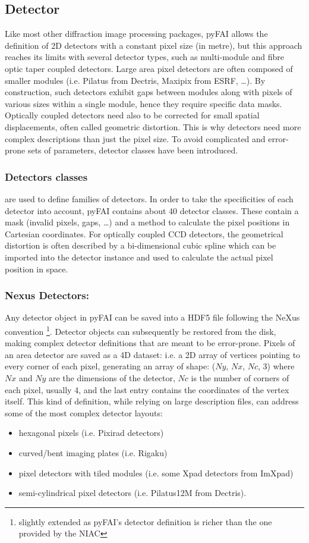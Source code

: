 \documentclass{iucr}
\begin{document}
\subsection{Detector}
Like most other diffraction image processing packages, pyFAI allows the definition of
2D detectors with a constant pixel size (in metre), but this approach reaches
its limits with several detector types, such as multi-module and fibre optic
taper coupled detectors.
Large area pixel detectors are often composed of smaller modules (i.e. Pilatus
from Dectris, Maxipix from ESRF,
\ldots).
By construction, such detectors exhibit gaps between modules along with
pixels of various sizes within a single module, hence they require specific
data masks.
Optically coupled detectors need also to be corrected
for small spatial displacements, often called geometric distortion.
This is why detectors need more complex descriptions than just the pixel size.
To avoid complicated and error-prone sets of parameters, detector classes have
been introduced.

\subsubsection{Detectors classes} are used to define families of detectors.
In order to take the specificities of each detector into account, pyFAI
contains about 40 detector classes. These contain a mask
(invalid pixels, gaps, \ldots) and a method to calculate the pixel positions in Cartesian
coordinates.
For optically coupled CCD detectors, the geometrical distortion is often
described by a bi-dimensional cubic spline which can be imported into
the detector instance and used to calculate the actual pixel position in space.

\subsubsection{Nexus Detectors:}
Any detector object in pyFAI can be saved into a HDF5 file following the NeXus
convention \cite{nexus}\footnote{slightly extended as pyFAI's detector
definition is richer than the one provided by the NIAC}.
Detector objects can subsequently be restored from the disk, making
complex detector definitions that are meant to be error-prone.
Pixels of an area detector are saved as a 4D dataset: i.e. a 2D
array of vertices pointing to every corner of each pixel, generating
an array of shape: ($Ny$, $Nx$, $Nc$, 3) where $Nx$ and $Ny$ are the dimensions of the
detector, $Nc$ is the number of corners of each pixel, usually 4, and the last
entry contains the coordinates of the vertex itself.
This kind of definition, while relying on large description files,
can address some of the most complex detector layouts:
\begin{itemize}
  \item hexagonal pixels (i.e. Pixirad detectors)
  \item curved/bent imaging plates (i.e. Rigaku)
  \item pixel detectors with tiled modules  (i.e. some Xpad detectors from
  ImXpad)
  \item semi-cylindrical pixel detectors (i.e. Pilatus12M from Dectris).
\end{itemize}
\end{document}
